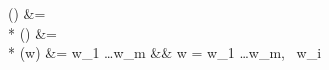 \elems() &{}=  \\*
\elems() &{}=  \\*
\elems(w) &{}= w_1 \cons \ldots \cons w_m && \quad {} w = w_1 \concat \ldots \concat w_m,\  w_i 
